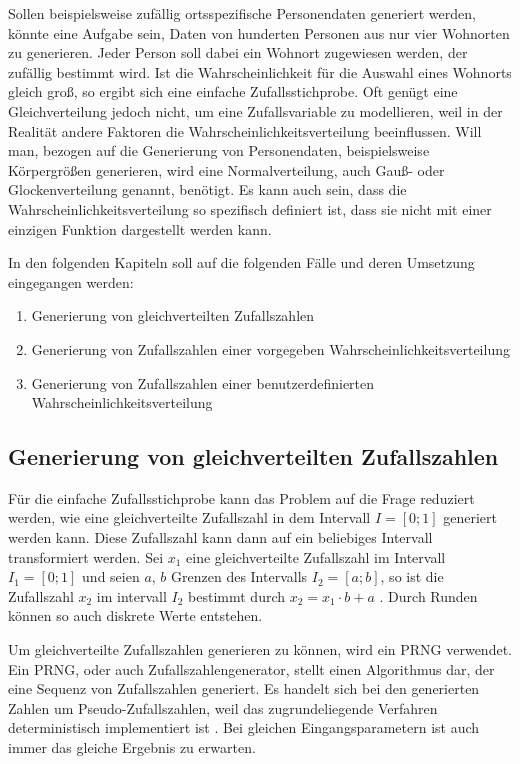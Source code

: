 Sollen beispielsweise zufällig ortsspezifische Personendaten generiert werden, könnte eine Aufgabe sein, Daten von hunderten Personen aus nur vier Wohnorten zu generieren. Jeder Person soll dabei ein Wohnort zugewiesen werden, der zufällig bestimmt wird. Ist die Wahrscheinlichkeit für die Auswahl eines Wohnorts gleich groß, so ergibt sich eine einfache Zufallsstichprobe. Oft genügt eine Gleichverteilung jedoch nicht, um eine Zufallsvariable zu modellieren, weil in der Realität andere Faktoren die Wahrscheinlichkeitsverteilung beeinflussen. Will man, bezogen auf die Generierung von Personendaten, beispielsweise Körpergrößen generieren, wird eine Normalverteilung, auch Gauß- oder Glockenverteilung genannt, benötigt. Es kann auch sein, dass die Wahrscheinlichkeitsverteilung so spezifisch definiert ist, dass sie nicht mit einer einzigen Funktion dargestellt werden kann.

In den folgenden Kapiteln soll auf die folgenden Fälle und deren Umsetzung eingegangen werden:
\begin{enumerate}
    \item Generierung von gleichverteilten Zufallszahlen
    \item Generierung von Zufallszahlen einer vorgegeben Wahrscheinlichkeitsverteilung
    \item Generierung von Zufallszahlen einer benutzerdefinierten Wahrscheinlichkeitsverteilung
\end{enumerate}

\subsection{Generierung von gleichverteilten Zufallszahlen}

Für die einfache Zufallsstichprobe kann das Problem auf die Frage reduziert werden, wie eine gleichverteilte Zufallszahl in dem Intervall $I=[0;1]$ generiert werden kann. Diese Zufallszahl kann dann auf ein beliebiges Intervall transformiert werden. Sei $x_1$ eine gleichverteilte Zufallszahl im Intervall $I_1=[0;1]$ und seien $a$, $b$ Grenzen des Intervalls $I_2=[a;b]$, so ist die Zufallszahl $x_2$ im intervall $I_2$ bestimmt durch $x_2=x_1 \cdot b+a$ \cite{prng}. Durch Runden können so auch diskrete Werte entstehen.

Um gleichverteilte Zufallszahlen generieren zu können, wird ein \ac{PRNG} verwendet. Ein \ac{PRNG}, oder auch Zufallszahlengenerator, stellt einen Algorithmus dar, der eine Sequenz von Zufallszahlen generiert. Es handelt sich bei den generierten Zahlen um Pseudo-Zufallszahlen, weil das zugrundeliegende Verfahren deterministisch implementiert ist \cite{prng}. Bei gleichen Eingangsparametern ist auch immer das gleiche Ergebnis zu erwarten. 

